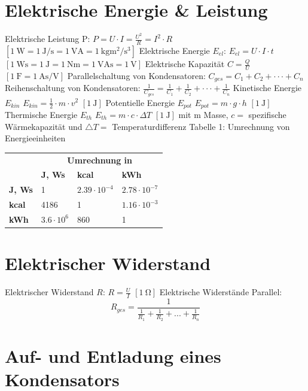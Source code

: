 \documentclass{article}
\begin{document}
	\section{Elektrische Energie \& Leistung}
	Elektrische Leistung P:
	$P=U\cdot I=\frac{U^{2}}{R}=I^{2}\cdot R$ $\left[\SI{1}{\watt}=\SI{1}{\joule\per\second}=\SI{1}{\volt\ampere}=\SI{1}{\kilogram\meter\squared\per\second\cubed}\right]$
	Elektrische Energie $E_{el}$:
	$E_{el}=U\cdot I\cdot t$ $\left[\SI{1}{\watt\second}=\SI{1}{\joule}=\SI{1}{\newton\meter}=\SI{1}{\volt\ampere\second}=\SI{1}{\volt}\right]$
	Elektrische Kapazität
	$C=\frac{Q}{U}$
	$\left[\SI{1}{\farad}=\SI{1}{\ampere\second\per\volt}\right]$
	Parallelschaltung von Kondensatoren:
	$C_{ges}=C_{1}+C_{2}+\cdot\cdot\cdot+C_{n}$
	Reihenschaltung von Kondensatoren:
	$\frac{1}{C_{ges}}=\frac{1}{C_{1}}+\frac{1}{C_{2}}+\cdot\cdot\cdot+\frac{1}{C_{n}}$
	Kinetische Energie $E_{kin}$
	$E_{kin}=\frac{1}{2}\cdot m\cdot v^{2}$
	$\left[\SI{1}{\joule}\right]$
	Potentielle Energie $E_{pot}$
	$E_{pot}=m\cdot g\cdot h$
	$\left[\SI{1}{\joule}\right]$
	Thermische Energie $E_{th}$
	$E_{th}=m\cdot c\cdot\Delta T$
	$\left[\SI{1}{\joule}\right]$
	mit m Masse, $c=$ spezifische Wärmekapazität und $\triangle T=$ Temperaturdifferenz
	Tabelle 1: Umrechnung von Energieeinheiten
	\begin{tabular}{|l|l|l|l|}
		\hline
		& \multicolumn{3}{c|}{\textbf{Umrechnung in}} \\
		\textbf{} & \textbf{J, Ws} & \textbf{kcal} & \textbf{kWh} \\
		\hline
		\textbf{J, Ws} & 1 & $2.39\cdot10^{-4}$ & $2.78\cdot10^{-7}$ \\
		\textbf{kcal} & 4186 & 1 & $1.16\cdot10^{-3}$ \\
		\textbf{kWh} & $3.6\cdot10^{6}$ & 860 & 1 \\
		\hline
	\end{tabular}
	
	\section{Elektrischer Widerstand}
	
	Elektrischer Widerstand $R$:
	$R=\frac{U}{I}$
	$\left[\SI{1}{\ohm}\right]$
		Elektrische Widerstände Parallel:
	$$R_{ges}=\frac{1}{\frac{1}{R_{1}}+\frac{1}{R_{2}}+...+\frac{1}{R_{n}}}$$
	\section{Auf- und Entladung eines Kondensators}
	
\end{document}
